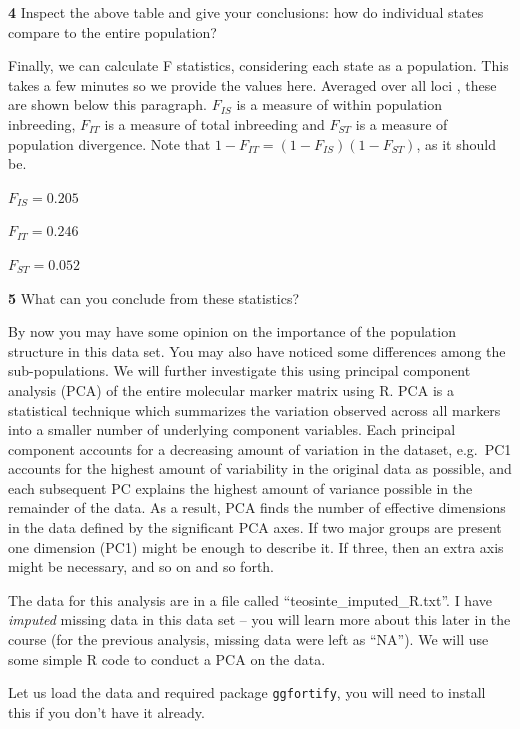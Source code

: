 \documentclass[
]{book}
\makeatletter
\newenvironment{kframe}{%
\medskip{}
\setlength{\fboxsep}{.8em}
 \def\at@end@of@kframe{}%
 \ifinner\ifhmode%
  \def\at@end@of@kframe{\end{minipage}}%
  \begin{minipage}{\columnwidth}%
 \fi\fi%
 \def\FrameCommand##1{\hskip\@totalleftmargin \hskip-\fboxsep
 \colorbox{shadecolor}{##1}\hskip-\fboxsep
     \hskip-\linewidth \hskip-\@totalleftmargin \hskip\columnwidth}%
 \MakeFramed {\advance\hsize-\width
   \@totalleftmargin\z@ \linewidth\hsize
   \@setminipage}}%
 {\par\unskip\endMakeFramed%
 \at@end@of@kframe}
\newenvironment{rmdblock}[1]
  {
  \begin{itemize}
  \renewcommand{\labelitemi}{
    \raisebox{-.7\height}[0pt][0pt]{
      {\setkeys{Gin}{width=3em,keepaspectratio}\texttt{[image: images/\#1]}}
    }
  }
  \setlength{\fboxsep}{1em}
  \begin{kframe}
  \item
  }
  {
  \end{kframe}
  \end{itemize}
  }
\newenvironment{rmdquiz}
  {\begin{rmdblock}{quiz}}
  {\end{rmdblock}}
\makeatother
\begin{document}
\begin{rmdquiz}
\textbf{4} Inspect the above table and give your conclusions: how do individual states compare to the entire population?\\
\end{rmdquiz}

Finally, we can calculate F statistics, considering each state as a population. This takes a few minutes so we provide the values here. Averaged over all loci , these are shown below this paragraph. \(F_{IS}\) is a measure of within population inbreeding, \(F_{IT}\) is a measure of total inbreeding and \(F_{ST}\) is a measure of population divergence. Note that \(1-F_{IT} = (1-F_{IS})(1-F_{ST})\), as it should be.

\(F_{IS} = 0.205\)

\(F_{IT} = 0.246\)

\(F_{ST}= 0.052\)

\begin{rmdquiz}
\textbf{5} What can you conclude from these statistics?
\end{rmdquiz}

By now you may have some opinion on the importance of the population structure in this data set. You may also have noticed some differences among the sub-populations. We will further investigate this using principal component analysis (PCA) of the entire molecular marker matrix using R. PCA is a statistical technique which summarizes the variation observed across all markers into a smaller number of underlying component variables. Each principal component accounts for a decreasing amount of variation in the dataset, e.g.~PC1 accounts for the highest amount of variability in the original data as possible, and each subsequent PC explains the highest amount of variance possible in the remainder of the data. As a result, PCA finds the number of effective dimensions in the data defined by the significant PCA axes. If two major groups are present one dimension (PC1) might be enough to describe it. If three, then an extra axis might be necessary, and so on and so forth.

The data for this analysis are in a file called ``teosinte\_imputed\_R.txt''. I have \emph{imputed} missing data in this data set -- you will learn more about this later in the course (for the previous analysis, missing data were left as ``NA''). We will use some simple R code to conduct a PCA on the data.

Let us load the data and required package \texttt{ggfortify}, you will need to install this if you don't have it already.
\end{document}
